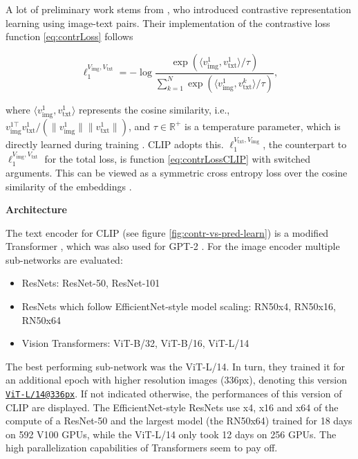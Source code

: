 \documentclass[
]{krantz}
\providecommand{\tightlist}{%
  \setlength{\itemsep}{0pt}\setlength{\parskip}{0pt}}
\begin{document}
A lot of preliminary work stems from \citet{zhang2020contrastive}, who introduced contrastive representation learning using image-text pairs.
Their implementation of the contrastive loss function \eqref{eq:contrLoss} follows

\begin{equation}
  \ell_1^{V_\text{img}, V_\text{txt}} = - \log \frac{\exp(\langle v_\text{img}^1, v_\text{txt}^1 \rangle / \tau)}{\sum_{k=1}^{N} \exp(\langle v_\text{img}^1, v_\text{txt}^k \rangle / \tau)},
  \label{eq:contrLossCLIP}
\end{equation}

where \(\langle v_\text{img}^1, v_\text{txt}^1 \rangle\) represents the cosine similarity, i.e., \(v_\text{img}^{1 \top} v_\text{txt}^1 / (\|v_\text{img}^1\| \|v_\text{txt}^1\|)\), and \(\tau \in \mathbb{R}^+\) is a temperature parameter, which is directly learned during training \citep{zhang2020contrastive}.
CLIP adopts this.
\(\ell_1^{V_\text{txt}, V_\text{img}}\), the counterpart to \(\ell_1^{V_\text{img}, V_\text{txt}}\) for the total loss, is function \eqref{eq:contrLossCLIP} with switched arguments.
This can be viewed as a symmetric cross entropy loss over the cosine similarity of the embeddings \citep{radford2021learning}.

\textbf{Architecture}

The text encoder for CLIP (see figure \ref{fig:contr-vs-pred-learn}) is a modified Transformer \citep{vaswani2017attention}, which was also used for GPT-2 \citep{radford2019language}.
For the image encoder multiple sub-networks are evaluated:

\begin{itemize}
\tightlist
\item
  ResNets: ResNet-50, ResNet-101
\item
  ResNets which follow EfficientNet-style model scaling: RN50x4, RN50x16, RN50x64
\item
  Vision Transformers: ViT-B/32, ViT-B/16, ViT-L/14
\end{itemize}

The best performing sub-network was the ViT-L/14.
In turn, they trained it for an additional epoch with higher resolution images (336px), denoting this version \href{mailto:ViT-L/14@336px}{\nolinkurl{ViT-L/14@336px}}.
If not indicated otherwise, the performances of this version of CLIP are displayed.
The EfficientNet-style ResNets use x4, x16 and x64 of the compute of a ResNet-50 and the largest model (the RN50x64) trained for 18 days on 592 V100 GPUs, while the ViT-L/14 only took 12 days on 256 GPUs.
The high parallelization capabilities of Transformers seem to pay off.
\end{document}

